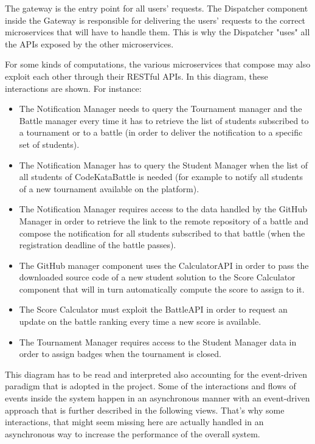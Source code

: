The gateway is the entry point for all users’ requests. The Dispatcher component inside the Gateway is responsible for delivering the users' requests to the correct microservices that will have to handle them. This is why the Dispatcher "uses" all the APIs exposed by the other microservices. 

For some kinds of computations, the various microservices that compose \app may also exploit each other through their RESTful APIs. In this diagram, these interactions are shown. 
For instance:
\begin{itemize}
	\item The Notification Manager needs to query the Tournament manager and the Battle manager every time it has to retrieve the list of students subscribed to a tournament or to a battle (in order to deliver the notification to a specific set of students).
	\item The Notification Manager has to query the Student Manager when the list of all students of CodeKataBattle is needed (for example to notify all students of a new tournament available on the platform).
	\item The Notification Manager requires access to the data handled by the GitHub Manager in order to retrieve the link to the remote repository of a battle and compose the notification for all students subscribed to that battle (when the registration deadline of the battle passes).
	\item The GitHub manager component uses the CalculatorAPI in order to pass the downloaded source code of a new student solution to the Score Calculator component that will in turn automatically compute the score to assign to it.
	\item The Score Calculator must exploit the BattleAPI in order to request an update on the battle ranking every time a new score is available.
	\item The Tournament Manager requires access to the Student Manager data in order to assign badges when the tournament is closed.
\end{itemize}

This diagram has to be read and interpreted also accounting for the event-driven paradigm that is adopted in the project. Some of the interactions and flows of events inside the system happen in an asynchronous manner with an event-driven approach that is further described in the following views. That's why some interactions, that might seem missing here are actually handled in an asynchronous way to increase the performance of the overall system.

